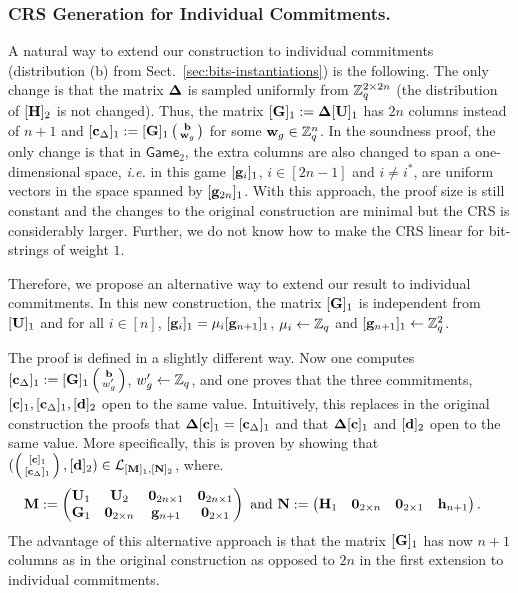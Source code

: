 \subsubsection{CRS Generation for Individual Commitments.}
A natural way to extend our construction to individual commitments (distribution (b) from Sect.\ \ref{sec:bits-instantiations}) is the following. The only change is that the matrix $\mathbf{{\Delta}}$ is sampled uniformly from  $\mathbb{Z}_q^{2 \times 2n}$ (the distribution of $[{\mathbf{{H}}}]_2$ is not changed). Thus, the matrix 
$[\mathbf{{G}}]_1:=\mathbf{{\Delta}} [\mathbf{{U}}]_1$ has $2n$ columns instead of $n+1$ and 
$[\mathbf{c}_{\Delta}]_1 := [\mathbf{{G}}]_1 \left(\begin{smallmatrix}\mathbf{b} \\ \mathbf{w}_g\end{smallmatrix}\right)$ for some $\mathbf{w}_g \in \mathbb{Z}_q^{n}$.   
In the soundness proof, the only change is that in $\mathsf{Game}_2$, the extra columns are also changed to span a one-dimensional space, \textit{i.e.} in this game $[\mathbf{g}_{i}]_1$, $i \in [2n-1]$ and $i \neq i^*$, are uniform vectors in the space spanned by $[\mathbf{g}_{2n}]_1$.
With this approach, the proof size is still constant and the changes to the original construction are minimal but the CRS is considerably larger. Further, we do not know how to make the CRS linear for bit-strings of weight $1$. 

Therefore, we propose an alternative way to extend our result to individual commitments.
In this new construction, the matrix $[\mathbf{{G}}]_1$ is independent from $[\mathbf{{U}}]_1$ and for all $i \in [n]$, $[\mathbf{g}_{i}]_1 = \mu_i [\mathbf{g}_{n+1}]_1$, $\mu_i \gets \mathbb{Z}_q$ and   $[\mathbf{g}_{n+1}]_1\gets\mathbb{Z}_q^2$. 

The proof is defined in a slightly different way. Now one computes $[\mathbf{c}_\Delta]_1:=[\mathbf{{G}}]_1\left(\begin{smallmatrix}\mathbf{b}\\w'_g\end{smallmatrix}\right)$, $w'_g\gets\mathbb{Z}_q$, and one proves that the three commitments, $[\mathbf{c}]_1,[\mathbf{c}_\Delta]_1,[\mathbf{d}]_2$ open to the same value.  Intuitively, this replaces in the original construction the proofs that $\mathbf{{\Delta}}[\mathbf{c}]_1=[\mathbf{c}_\Delta]_1$ and that $\mathbf{{\Delta}}[\mathbf{c}]_1$ and $[\mathbf{d}]_2$ open to the same value. More specifically, this is proven by showing that $(\left(\begin{smallmatrix}{[\mathbf{c}]_1}\\{[\mathbf{c}_\Delta]_1}\end{smallmatrix}\right), [\mathbf{d}]_2)\in\mathcal{L}_{[\mathbf{{M}}]_1,[\mathbf{{N}}]_2}$, where.
\begin{align*}
&\mathbf{{M}} := 
\left(\begin{matrix}
    \mathbf{{U}}_1 & \mathbf{{U}}_2           & \mathbf{{0}}_{2n\times 1} & \mathbf{{0}}_{2n\times 1}\\
    \mathbf{G}_1      & \mathbf{{0}}_{2\times n} & \mathbf{g}_{n+1}             & \mathbf{{0}}_{2\times 1}\\
\end{matrix}\right)
\text{ and }
\mathbf{{N}} :=
\left(\begin{matrix}
    \mathbf{H}_1      & \mathbf{{0}}_{2\times n} & \mathbf{{0}}_{2\times 1}  & \mathbf{h}_{n+1}
\end{matrix}\right).
\end{align*}
The advantage of this alternative approach is that the matrix $[\mathbf{{G}}]_1$ has now $n+1$ columns as in the original construction as opposed to $2n$ in the first extension to individual commitments.  


